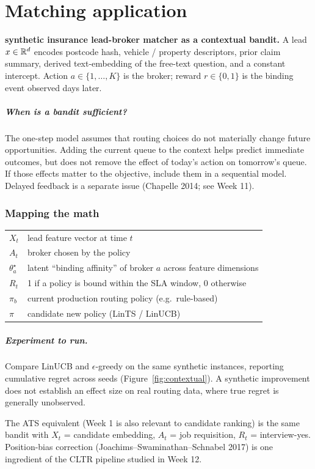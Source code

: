 \documentclass[11pt,oneside]{scrbook}
\begin{document}
\chapter{Matching application}

\begin{matching}
\textbf{synthetic insurance lead-broker matcher as a contextual bandit.}
A lead $x\in\mathbb{R}^d$ encodes postcode hash, vehicle / property descriptors,
prior claim summary, derived text-embedding of the free-text question, and a
constant intercept. Action $a\in\{1,\dots,K\}$ is the broker; reward
$r\in\{0,1\}$ is the binding event observed days later.

\paragraph{When is a bandit sufficient?} The one-step model assumes that
routing choices do not materially change future opportunities. Adding the
current queue to the context helps predict immediate outcomes, but does not
remove the effect of today's action on tomorrow's queue. If those effects
matter to the objective, include them in a sequential model. Delayed feedback
is a separate issue (Chapelle 2014; see Week 11).

\subsection*{Mapping the math}
\begin{tabular}{@{}p{1.3cm}p{\dimexpr\linewidth-1.3cm-2\tabcolsep\relax}@{}}
$X_t$ & lead feature vector at time $t$ \\
$A_t$ & broker chosen by the policy \\
$\theta^\star_a$ & latent ``binding affinity'' of broker $a$ across feature
                   dimensions \\
$R_t$ & 1 if a policy is bound within the SLA window, 0 otherwise \\
$\pi_b$ & current production routing policy (e.g.\ rule-based) \\
$\pi$ & candidate new policy (LinTS / LinUCB)
\end{tabular}

\paragraph{Experiment to run.} Compare LinUCB and $\epsilon$-greedy on the
same synthetic instances, reporting cumulative regret across seeds
(Figure~\ref{fig:contextual}). A synthetic improvement does not establish
an effect size on real routing data, where true regret is generally unobserved.

The ATS equivalent (Week 1 is also relevant to candidate ranking) is the
same bandit with $X_t$ = candidate embedding, $A_t$ = job requisition, $R_t$ =
interview-yes. Position-bias correction (Joachims--Swaminathan--Schnabel 2017)
is one ingredient of the CLTR pipeline studied in Week 12.
\end{matching}
\end{document}
